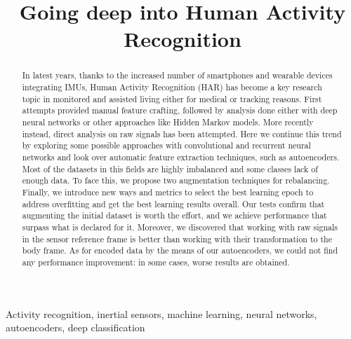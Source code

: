 \documentclass[journal,10pt,twoside]{IEEEtran}
\title{Going deep into Human Activity Recognition}
\author{%
    \IEEEauthorblockN{Elia Bonetto and Filippo Rigotto}

    \IEEEauthorblockA{Department of Information Engineering, University of Padova -- Via Gradenigo, 6/b, 35131 Padova, Italy\\ %
        {\tt\{eliabntt94,rigotto.filippo\}@gmail.com}}
}
\begin{document}
\maketitle

\begin{abstract}
In latest years, thanks to the increased number of smartphones and wearable devices integrating IMUs, Human Activity Recognition (HAR) has become a key research topic in monitored and assisted living either for medical or tracking reasons.
First attempts provided manual feature crafting, followed by analysis done either with deep neural networks or other approaches like Hidden Markov models.
More recently instead, direct analysis on raw signals has been attempted.
Here we continue this trend by exploring some possible approaches with convolutional and recurrent neural networks and look over automatic feature extraction techniques, such as autoencoders.
Most of the datasets in this fields are highly imbalanced and some classes lack of enough data.
To face this, we propose two augmentation techniques for rebalancing.
Finally, we introduce new ways and metrics to select the best learning epoch to address overfitting and get the best learning results overall.
Our tests confirm that augmenting the initial dataset is worth the effort, and we achieve performance that surpass what is declared for it.
Moreover, we discovered that working with raw signals in the sensor reference frame is better than working with their transformation to the body frame.
As for encoded data by the means of our autoencoders, we could not find any performance improvement: in some cases, worse results are obtained.
\end{abstract}

\begin{IEEEkeywords}
Activity recognition, inertial sensors, machine learning, neural networks, autoencoders, deep classification
\end{IEEEkeywords}









\end{document}
